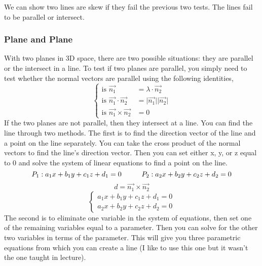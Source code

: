\documentclass{article}
\begin{document}
We can show two lines are skew if they fail the previous two tests. The lines fail to be parallel or intersect. 

\subsubsection{Plane and Plane}
With two planes in 3D space, there are two possible situations: they are parallel or the intersect in a line. To test if two planes are parallel, you simply need to test whether the normal vectors are parallel using the following identities, 
$$\left\{\begin{array}{lr}
\text{is } \vec{n_1} &= \lambda \cdot \vec{n_2}\\
\text{is } \vec{n_1} \cdot \vec{n_2} &= \lvert\vec{n_1}\rvert\lvert\vec{n_2}\rvert \\
\text{is } \vec{n_1} \times \vec{n_2} &= 0
\end{array}
\right.$$
If the two planes are not parallel, then they intersect at a line. You can find the line through two methods. The first is to find the direction vector of the line and a point on the line separately. You can take the cross product of the normal vectors to find the line's direction vector. Then you can set either x, y, or z equal to 0 and solve the system of linear equations to find a point on the line. 
$$P_1: a_1x + b_1y + c_1z + d_1 = 0 \hspace{1 cm} P_2: a_2x + b_2y + c_2z + d_2 = 0$$
$$d = \vec{n_1} \times \vec{n_2}$$
$$\left\{ \begin{array}{lr}
a_1x + b_1y + c_1z + d_1 = 0 \\
a_2x + b_2y + c_2z + d_2 = 0
\end{array} \right.$$
The second is to eliminate one variable in the system of equations, then set one of the remaining variables equal to a parameter. Then you can solve for the other two variables in terms of the parameter. This will give you three parametric equations from which you can create a line (I like to use this one but it wasn't the one taught in lecture). 
\end{document}
